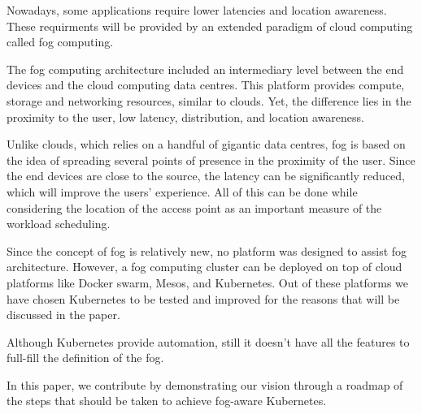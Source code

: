 \documentclass[letterpaper,twocolumn,10pt]{article}
\begin{document}


Nowadays, some applications require lower latencies and location awareness. These requirments will be provided by an extended paradigm of cloud computing called fog computing\cite{bonomi2011connected,Bonomi:2012:FCR:2342509.2342513}.

The fog computing architecture included an intermediary level between the end devices and the cloud computing data centres. This platform provides compute, storage and networking resources, similar to clouds. Yet, the difference lies in the proximity to the user, low latency, distribution, and location awareness. 

Unlike clouds, which relies on a handful of gigantic data centres, fog is based on the idea of spreading several points of presence in the proximity of the user. Since the end devices are close to the source, the latency can be significantly reduced, which will improve the users' experience. All of this can be done while considering the location of the access point as an important measure of the workload scheduling.

Since the concept of fog is relatively new, no platform was designed to assist fog architecture. However, a fog computing cluster can be deployed on top of cloud platforms like Docker swarm, Mesos, and Kubernetes. Out of these platforms we have chosen Kubernetes to be tested and improved for the reasons that will be discussed in the paper.

Although Kubernetes provide automation, still it doesn't have all the features to full-fill the definition of the fog.    

In this paper, we contribute by demonstrating our vision through a roadmap of the steps that should be taken to achieve fog-aware Kubernetes.
\end{document}
